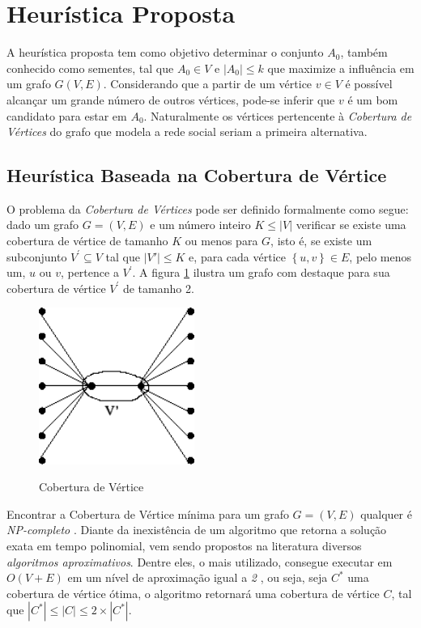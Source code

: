 \documentclass[12pt]{article}
\begin{document}
\section{Heurística Proposta}
\label{sec:heuristica}


A heurística proposta tem como objetivo determinar o conjunto $A_{0}$, também conhecido como sementes, tal que $A_{0} \in V$ e $|A_{0}| \leq k$ que maximize a influência em um grafo $G(V,E)${}. Considerando que a partir de um vértice $v \in V$ é possível alcançar um grande número de outros vértices, pode-se inferir que $v$ é um bom candidato para estar em $A_{0}$. Naturalmente os vértices pertencente à \textit{Cobertura de Vértices} do grafo que modela a rede social seriam a primeira alternativa.

\subsection{Heurística Baseada na Cobertura de Vértice}
\label{subsec:heuritica_vertex_cover}
O problema da \textit{Cobertura de Vértices} \cite{Garey:1979:CIG:578533}{} pode ser definido formalmente como segue: dado um grafo $G=(V,E)$ e um número inteiro $K\leq\left\vert V\right\vert$ verificar se existe uma cobertura de vértice de tamanho $K$ ou menos para $G$, isto é, se existe um subconjunto $V^{'} \subseteq V$ tal que $\left\vert V '\right\vert\leq K$ e, para cada vértice $\left\{ u,v\right\} \in E$, pelo menos um, $u$ ou $v$, pertence a $V^{'}${}. A figura \ref{fig_vertex_cover} ilustra um grafo com destaque para sua cobertura de vértice $V^{'}$ de tamanho 2.

\begin{figure}[!t]
\centering
\includegraphics[width=2.0in]{../img/vertex_cover.png}
\label{fig_vertex_cover}
\caption{Cobertura de Vértice}
\end{figure}

Encontrar a Cobertura de Vértice mínima para um grafo $G=(V,E)$ qualquer é \textit{NP-completo}{} \cite{Garey:1979:CIG:578533, Cormen:2009:IAT:1614191}{}. Diante da inexistência de um algoritmo que retorna a solução exata em tempo polinomial, vem sendo propostos na literatura diversos \textit{algoritmos aproximativos}. Dentre eles, o mais utilizado, consegue executar em $O(V+E)$ em um nível de aproximação igual a \textit{2} \cite{Cormen:2009:IAT:1614191}, ou seja, seja $C^{*}$ uma cobertura de vértice ótima, o algoritmo retornará uma cobertura de vértice $C$, tal que $|C^{*}| \leq |C| \leq 2 \times |C^{*}|${}.
\end{document}
